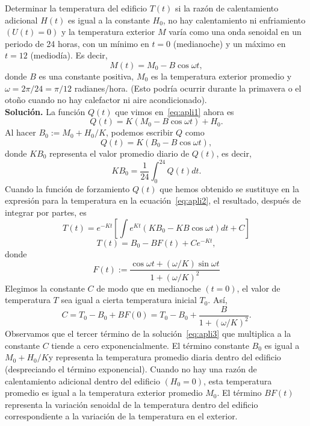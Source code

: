 \begin{ejemplo}
	Determinar la temperatura del edificio $T(t)$ si la razón de calentamiento adicional $H(t)$ es igual a la constante $H_0$, no hay calentamiento ni enfriamiento $(U(t) = 0)$ y la temperatura exterior $M$ varía como una onda senoidal en un periodo de 24 horas, con un mínimo en $t = 0$ (medianoche) y un máximo en $t = 12$ (mediodía). Es decir, 
	\begin{equation}
		M(t) = M_0 - B \cos \omega t,
	\end{equation}
	donde $B$ es una constante positiva, $M_0$ es la temperatura exterior promedio y $\omega = 2\pi /24 =\pi /12$ radianes/hora. (Esto podría ocurrir durante la primavera o el otoño cuando no hay calefactor ni aire acondicionado).\\
	\textbf{Solución.} La función $Q(t)$ que vimos en~\eqref{eq:apli1} ahora es
	\begin{equation}
		Q(t) = K(M_0 - B \cos \omega t) + H_0.
	\end{equation}
	Al hacer $B_0 := M_0 + H_0/K$, podemos escribir $Q$ como
	\begin{equation}
		Q(t) = K(B_0 - B \cos \omega t),
	\end{equation}
	donde $KB_0$ representa el valor promedio diario de $Q(t)$, es decir,
	\begin{equation}
		KB_0 = \dfrac{1}{24}\int_{0}^{24}Q(t)dt.
	\end{equation}
	Cuando la función de forzamiento $Q(t)$ que hemos obtenido se sustituye en la expresión para la temperatura en la ecuación~\eqref{eq:apli2}, el resultado, después de integrar por partes, es
	\begin{equation}
		T(t) = e^{-Kt}[\int e^{Kt}(KB_0 - KB \cos \omega t)dt + C]
	\end{equation}
	\begin{equation}\label{eq:apli3}
		T(t) = B_0 - BF(t) + Ce^{-Kt},
	\end{equation}
	donde
	\begin{equation}
		F(t) := \dfrac{\cos \omega t + (\omega / K) \sin \omega t}{1 + (\omega /K)^2}
	\end{equation}
	Elegimos la constante $C$ de modo que en medianoche $(t=0)$, el valor de temperatura $T$ sea igual a cierta temperatura inicial $T_0$. Así,
	\begin{equation}
		C = T_0 - B_0 + BF(0) = T_0 - B_0 + \dfrac{B}{1 + (\omega /K)^2}.
	\end{equation}
	Observamos que el tercer término de la solución~\eqref{eq:apli3} que multiplica a la constante $C$ tiende a cero exponencialmente. El término constante $B_0$ es igual a $M_0 + H_0/K$y representa la temperatura promedio diaria dentro del edificio (despreciando el término exponencial). Cuando no hay una razón de calentamiento adicional dentro del edificio $(H_0 = 0)$, esta temperatura promedio es igual a la temperatura exterior promedio $M_0$. El término $BF(t)$ representa la variación senoidal de la temperatura dentro del edificio correspondiente a la variación de la temperatura en el exterior.
	

\end{ejemplo}

